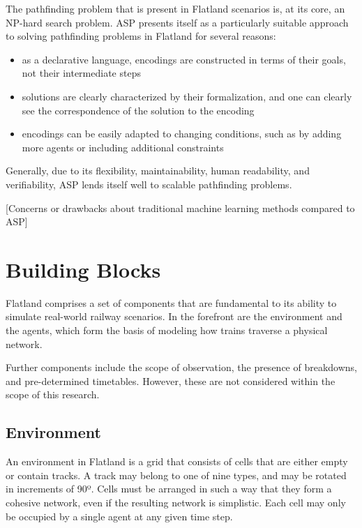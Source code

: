 \documentclass[11pt]{article}
\begin{document}

The pathfinding problem that is present in Flatland scenarios is, at its core, an NP-hard search problem.  ASP presents itself as a particularly suitable approach to solving pathfinding problems in Flatland for several reasons:
\begin{itemize}
	\item as a declarative language, encodings are constructed in terms of their goals, not their intermediate steps
	\item solutions are clearly characterized by their formalization, and one can clearly see the correspondence of the solution to the encoding
	\item encodings can be easily adapted to changing conditions, such as by adding more agents or including additional constraints
\end{itemize}

\noindent Generally, due to its flexibility, maintainability, human readability, and verifiability, ASP lends itself well to scalable pathfinding problems. \medskip

[Concerns or drawbacks about traditional machine learning methods compared to ASP]

\section{Building Blocks}
Flatland comprises a set of components that are fundamental to its ability to simulate real-world railway scenarios.  In the forefront are the environment and the agents, which form the basis of modeling how trains traverse a physical network.

Further components include the scope of observation, the presence of breakdowns, and pre-determined timetables.  However, these are not considered within the scope of this research.

\subsection{Environment}
\label{sec:Environment}
An environment in Flatland is a grid that consists of cells that are either empty or contain tracks.  A track may belong to one of nine types, and may be rotated in increments of 90º.  Cells must be arranged in such a way that they form a cohesive network, even if the resulting network is simplistic.  Each cell may only be occupied by a single agent at any given time step.
\end{document}

